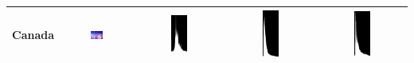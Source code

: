 \documentclass[12pt,a4paper]{article}
\begin{document}
\begin{center}
\begin{longtable}{|c|c|c|c|c|}
    Canada & \includegraphics[width=0.2\textwidth]{./latexSource/Canada_process.png} & 
           \includegraphics[width=0.2\textwidth]{./latexSource/Canada_B_EQUA.png} & 
           \includegraphics[width=0.2\textwidth]{./latexSource/Canada_G_EQUA.png} & 
           \includegraphics[width=0.2\textwidth]{./latexSource/Canada_R_EQUA.png} \\ 
    \hline
    \end{longtable}
    \end{center}
    
\end{document}
